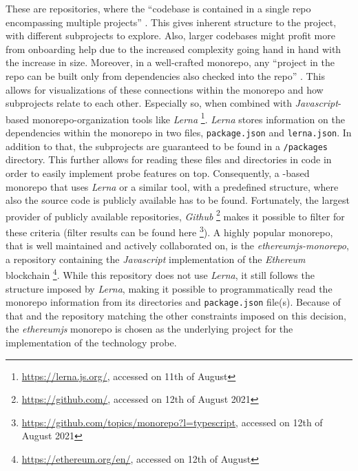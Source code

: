 These are repositories, where the \enquote{codebase is contained in a single repo encompassing multiple projects} \cite[p. 226]{jaspan2018advantages}. This gives inherent structure to the project, with different subprojects to explore. Also, larger codebases might profit more from onboarding help due to the increased complexity going hand in hand with the increase in size. Moreover, in a well-crafted monorepo, any \enquote{project in the repo can be built only from dependencies also checked into the repo} \cite[p. 226]{jaspan2018advantages}. This allows for visualizations of these connections within the monorepo and how subprojects relate to each other. Especially so, when combined with \textit{Javascript}-based monorepo-organization tools like \textit{Lerna} \footnote{\url{https://lerna.js.org/}, accessed on 11th of August}. \textit{Lerna} stores information on the dependencies within the monorepo in two files, \verb|package.json| and \verb|lerna.json|. In addition to that, the subprojects are guaranteed to be found in a \verb|/packages| directory. This further allows for reading these files and directories in code in order to easily implement probe features on top. Consequently, a -based monorepo that uses \textit{Lerna} or a similar tool, with a predefined structure, where also the source code is publicly available has to be found. Fortunately, the largest provider of publicly available repositories, \textit{Github} \footnote{\url{https://github.com/}, accessed on 12th of August 2021} makes it possible to filter for these criteria (filter results can be found here \footnote{\url{https://github.com/topics/monorepo?l=typescript}, accessed on 12th of August 2021}). A highly popular monorepo, that is well maintained and actively collaborated on, is the \textit{ethereumjs-monorepo}, a repository containing the \textit{Javascript} implementation of the \textit{Ethereum} blockchain \footnote{\url{https://ethereum.org/en/}, accessed on 12th of August}. While this repository does not use \textit{Lerna}, it still follows the structure imposed by \textit{Lerna}, making it possible to programmatically read the monorepo information from its directories and \verb|package.json| file(s). Because of that and the repository matching the other constraints imposed on this decision, the \textit{ethereumjs} monorepo is chosen as the underlying project for the implementation of the technology probe.

